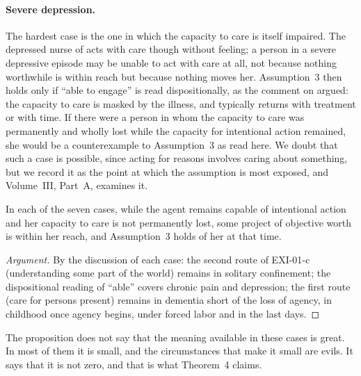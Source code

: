 \paragraph{Severe depression.} The hardest case is the one in which the capacity to care is itself impaired. The depressed nurse of  acts with care though without feeling; a person in a severe depressive episode may be unable to act with care at all, not because nothing worthwhile is within reach but because nothing moves her. Assumption~3 then holds only if \enquote{able to engage} is read dispositionally, as the comment on  argued: the capacity to care is masked by the illness, and typically returns with treatment or with time. If there were a person in whom the capacity to care was permanently and wholly lost while the capacity for intentional action remained, she would be a counterexample to Assumption~3 as read here. We doubt that such a case is possible, since acting for reasons involves caring about something, but we record it as the point at which the assumption is most exposed, and Volume~III, Part~A, examines it.

\begin{proposition}\label{p:reach}
In each of the seven cases, while the agent remains capable of intentional action and her capacity to care is not permanently lost, some project of objective worth is within her reach, and Assumption~3 holds of her at that time.
\end{proposition}

\begin{proof}[Argument]
By the discussion of each case: the second route of EXI-01-c (understanding some part of the world) remains in solitary confinement; the dispositional reading of \enquote{able} covers chronic pain and depression; the first route (care for persons present) remains in dementia short of the loss of agency, in childhood once agency begins, under forced labor and in the last days.
\end{proof}

The proposition does not say that the meaning available in these cases is great. In most of them it is small, and the circumstances that make it small are evils. It says that it is not zero, and that is what Theorem~4 claims.
